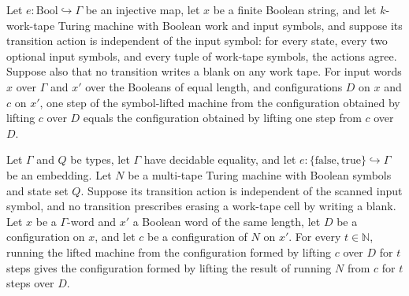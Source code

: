 \begin{theorem}
\label{Turing.MultiTapeTM.liftSymbols_step_over}
\leanok
{}
Let $e:\mathrm{Bool}\hookrightarrow\Gamma$ be an injective map, let $x$ be a finite Boolean string, and let
$k$-work-tape Turing machine with Boolean work and input symbols, and suppose its
transition action is independent of the input symbol: for every state, every two
optional input symbols, and every tuple of work-tape symbols, the actions agree. Suppose
also that no transition writes a blank on any work tape. For input words $x$ over
$\Gamma$ and $x'$ over the Booleans of equal length, and configurations $D$ on $x$ and
$c$ on $x'$, one step of the symbol-lifted machine from the configuration obtained by
lifting $c$ over $D$ equals the configuration obtained by lifting one step from $c$ over
$D$.
\end{theorem}

\begin{theorem}
\label{Turing.MultiTapeTM.liftSymbols_runFrom_over}
\leanok
{}
Let $\Gamma$ and $Q$ be types, let $\Gamma$ have decidable equality, and let
$e:\{\mathrm{false},\mathrm{true}\}\hookrightarrow\Gamma$ be an embedding. Let $N$ be a
multi-tape Turing machine with Boolean symbols and state set $Q$. Suppose its transition
action is independent of the scanned input symbol, and no transition prescribes erasing
a work-tape cell by writing a blank. Let $x$ be a $\Gamma$-word and $x'$ a Boolean word
of the same length, let $D$ be a configuration on $x$, and let $c$ be a configuration of
$N$ on $x'$. For every $t\in\mathbb{N}$, running the lifted machine from the
configuration formed by lifting $c$ over $D$ for $t$ steps gives the configuration
formed by lifting the result of running $N$ from $c$ for $t$ steps over $D$.
\end{theorem}

